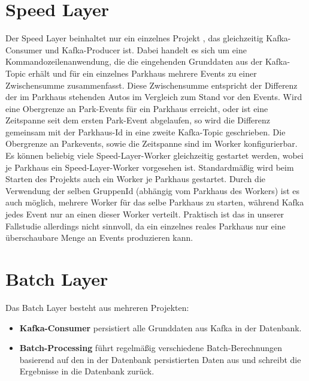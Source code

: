 \section{Speed Layer}
Der Speed Layer beinhaltet nur ein einzelnes Projekt , das gleichzeitig Kafka-Consumer und Kafka-Producer ist.
Dabei handelt es sich um eine Kommandozeilenanwendung, die die eingehenden Grunddaten aus der Kafka-Topic  erhält und für ein einzelnes Parkhaus mehrere Events zu einer Zwischensumme zusammenfasst.
Diese Zwischensumme entspricht der Differenz der im Parkhaus stehenden Autos im Vergleich zum Stand vor den Events.
Wird eine Obergrenze an Park-Events für ein Parkhaus erreicht, oder ist eine Zeitspanne seit dem ersten Park-Event abgelaufen, so wird die Differenz gemeinsam mit der Parkhaus-Id in eine zweite Kafka-Topic  geschrieben.
Die Obergrenze an Parkevents, sowie die Zeitspanne sind im Worker konfigurierbar.
Es können beliebig viele Speed-Layer-Worker gleichzeitig gestartet werden, wobei je Parkhaus ein Speed-Layer-Worker vorgesehen ist.
Standardmäßig wird beim Starten des Projekts auch ein Worker je Parkhaus gestartet.
Durch die Verwendung der selben GruppenId (abhängig vom Parkhaus des Workers) ist es auch möglich, mehrere Worker für das selbe Parkhaus zu starten, während Kafka jedes Event nur an einen dieser Worker verteilt.
Praktisch ist das in unserer Fallstudie allerdings nicht sinnvoll, da ein einzelnes reales Parkhaus nur eine überschaubare Menge an Events produzieren kann.


\section{Batch Layer}
Das Batch Layer besteht aus mehreren Projekten:
\begin{itemize}
    \item \textbf{Kafka-Consumer} persistiert alle Grunddaten aus Kafka in der Datenbank.
    \item \textbf{Batch-Processing} führt regelmäßig verschiedene Batch-Berechnungen basierend auf den in der Datenbank persistierten Daten aus und schreibt die Ergebnisse in die Datenbank zurück. 
\end{itemize}

